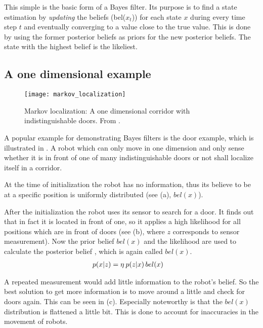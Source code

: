 \documentclass[Thesis.tex]{subfiles}
\begin{document}
This simple  is the basic form of a Bayes filter. Its purpose is to find a state estimation by \emph{updating} the beliefs (bel($x_t$)) for each state $x$ during every time step $t$ and eventually converging to a value close to the true value. This is done by using the former posterior beliefs as priors for the new posterior beliefs.
The state with the highest belief is the likeliest.

\subsection{A one dimensional example}\label{sec:doorex}
\begin{figure}
  \centering
  \texttt{[image: markov\_localization]}
  \caption[1D Markov localization]{Markov localization: A one dimensional corridor with indistinguishable doors. From \cite{ThrunBurgardFox:2005}.}
  \label{fig:markov_localization_one_dimension}
\end{figure}

A popular example for demonstrating Bayes filters is the door example, which is illustrated in . A robot which can only move in one dimension and only sense whether it is in front of one of many indistinguishable doors or not shall localize itself in a corridor. 

At the time of initialization the robot has no information, thus its believe to be at a specific position is uniformly distributed (see (a), $bel(x)$).

After the initialization the robot uses its sensor to search for a door. It finds out that in fact it is located in front of one, so it applies a high likelihood for all positions which are in front of doors (see (b),  where $z$ corresponds to sensor measurement). Now the prior belief $bel(x)$ and the likelihood  are used to calculate the posterior belief , which is again called $bel(x)$.
%
\begin{align}
p\!\left({x}\middle|{z}\right) &= \eta\: p\!\left({z}\middle|{x}\right) bel(x) \label{eq:door_bayes}
\end{align}

A repeated measurement would add little information to the robot's belief. So the best solution to get more information is to move around a little and check for doors again. This can be seen in (c). Especially noteworthy is that the $bel(x)$ distribution is flattened a little bit. This is done to account for inaccuracies in the movement of robots.
\end{document}
